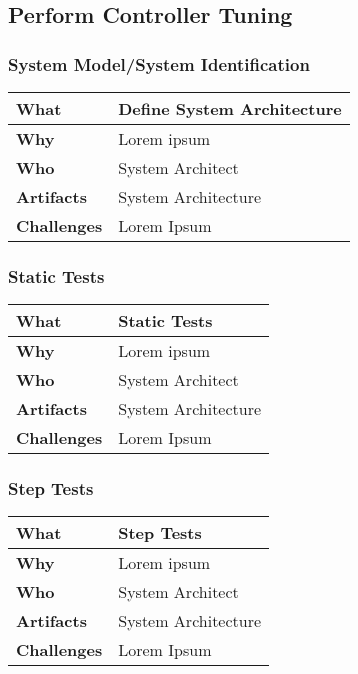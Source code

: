 \subsection{Perform Controller Tuning}
\subsubsection{System Model/System Identification}
\begin{minipage}{\textwidth}
	 \label{table:ch6_Task_Controler_Tuning} 
	\begin{tabular}
		{|m{3cm}|m{10cm}|} \hline \bfseries What & Define System Architecture\\
		\hline \bfseries Why & Lorem ipsum\\
		\hline \bfseries Who & System Architect\\
		\hline \bfseries Artifacts & System Architecture\\
		\hline \bfseries Challenges & Lorem Ipsum\\
		\hline 
	\end{tabular}
\end{minipage}

\subsubsection{Static Tests}
\begin{minipage}{\textwidth}
 \label{table:ch6_Task_Static_Tests}
\begin{tabular}
	{|m{3cm}|m{10cm}|} \hline \bfseries What & Static Tests\\
	\hline \bfseries Why & Lorem ipsum\\
	\hline \bfseries Who & System Architect\\
	\hline \bfseries Artifacts & System Architecture\\
	\hline \bfseries Challenges & Lorem Ipsum\\
	\hline 
\end{tabular}
\end{minipage}

\subsubsection{Step Tests}
\begin{minipage}{\textwidth}
 \label{table:ch6_Task_Step_Tests}
\begin{tabular}
	{|m{3cm}|m{10cm}|} \hline \bfseries What & Step Tests\\
	\hline \bfseries Why & Lorem ipsum\\
	\hline \bfseries Who & System Architect\\
	\hline \bfseries Artifacts & System Architecture\\
	\hline \bfseries Challenges & Lorem Ipsum\\
	\hline 
\end{tabular}
\end{minipage}

